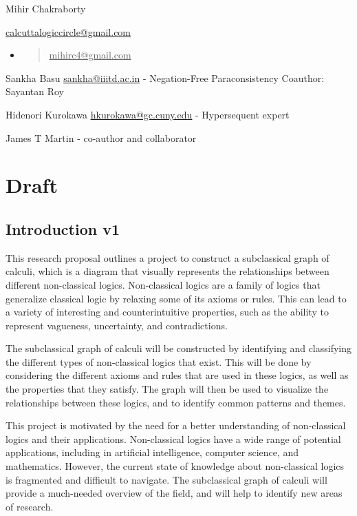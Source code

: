 Mihir Chakraborty

\ul{calcuttalogiccircle@gmail.com}

\begin{itemize}
\item
  \begin{quote}
  \ul{mihirc4@gmail.com}
  \end{quote}
\end{itemize}

Sankha Basu \href{mailto:sankha@iiitd.ac.in}{\ul{sankha@iiitd.ac.in}} -
Negation-Free Paraconsistency Coauthor: Sayantan Roy

Hidenori Kurokawa
\href{mailto:hkurokawa@gc.cuny.edu}{\ul{hkurokawa@gc.cuny.edu}} -
Hypersequent expert

James T Martin - co-author and collaborator

\hypertarget{draft}{%
\section{Draft}\label{draft}}

\hypertarget{introduction-v1}{%
\subsection{Introduction v1}\label{introduction-v1}}

This research proposal outlines a project to construct a subclassical
graph of calculi, which is a diagram that visually represents the
relationships between different non-classical logics. Non-classical
logics are a family of logics that generalize classical logic by
relaxing some of its axioms or rules. This can lead to a variety of
interesting and counterintuitive properties, such as the ability to
represent vagueness, uncertainty, and contradictions.

The subclassical graph of calculi will be constructed by identifying and
classifying the different types of non-classical logics that exist. This
will be done by considering the different axioms and rules that are used
in these logics, as well as the properties that they satisfy. The graph
will then be used to visualize the relationships between these logics,
and to identify common patterns and themes.

This project is motivated by the need for a better understanding of
non-classical logics and their applications. Non-classical logics have a
wide range of potential applications, including in artificial
intelligence, computer science, and mathematics. However, the current
state of knowledge about non-classical logics is fragmented and
difficult to navigate. The subclassical graph of calculi will provide a
much-needed overview of the field, and will help to identify new areas
of research.

